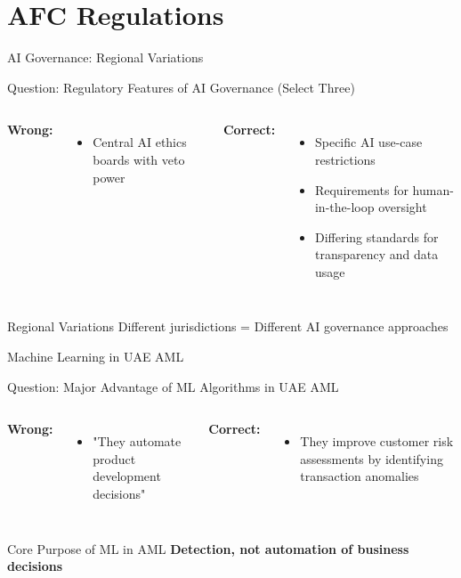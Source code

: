 \documentclass{beamer}
\begin{document}
\section{AFC Regulations}
\begin{frame}{AI Governance: Regional Variations}
\begin{block}{Question: Regulatory Features of AI Governance (Select Three)}
\end{block}

\begin{columns}
\textcolor{wrong}{\textbf{ Wrong:}}
\begin{itemize}
    \item Central AI ethics boards with veto power
\end{itemize}

\textcolor{correct}{\textbf{Correct:}}
\begin{itemize}
    \item Specific AI use-case restrictions
    \item Requirements for human-in-the-loop oversight
    \item Differing standards for transparency and data usage
\end{itemize}
\end{columns}

\begin{block}{Regional Variations}
Different jurisdictions = Different AI governance approaches
\end{block}
\end{frame}

\begin{frame}{Machine Learning in UAE AML}
\begin{block}{Question: Major Advantage of ML Algorithms in UAE AML}
\end{block}

\begin{columns}
\textcolor{wrong}{\textbf{ Wrong:}}
\begin{itemize}
    \item "They automate product development decisions"
\end{itemize}

\textcolor{correct}{\textbf{Correct:}}
\begin{itemize}
    \item They improve customer risk assessments by identifying transaction anomalies
\end{itemize}
\end{columns}

\begin{block}{Core Purpose of ML in AML}
\textbf{Detection, not automation of business decisions}
\end{block}
\end{frame}
\end{document}
